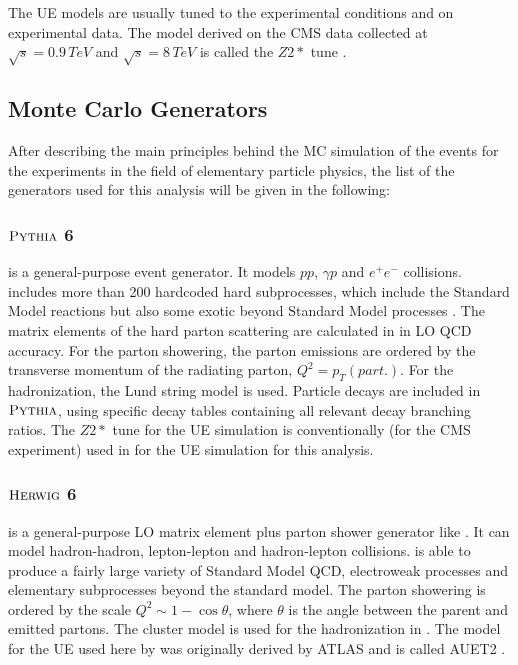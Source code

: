 
The UE models are usually tuned to the experimental conditions and on experimental data. The model derived on the CMS data collected at $\sqrt{s} = 0.9\, TeV$
and $\sqrt{s} = 8\,TeV$ is called the $Z2*$ tune \cite{Chatrchyan:2011id}.


\subsection{Monte Carlo Generators}

After describing the main principles behind the MC simulation of the events for the experiments in the field of elementary particle
physics, the list of the generators used for this analysis will be given in the following:

\subsubsection{$\textsc{Pythia}$ 6}

\PYTHIA \cite{Sjostrand:2006za} is a general-purpose event generator. It models $pp$, $\gamma p$ and $e^{+}e^{-}$ collisions. \PYTHIA includes more than 200 hardcoded
hard subprocesses, which include the Standard Model reactions but also some exotic beyond Standard Model processes \cite{Buckley:2011ms}.
%
The matrix elements of the hard parton scattering are calculated in \PYTHIA in LO QCD accuracy.
%
For the parton showering, the parton emissions are ordered by the transverse momentum of the radiating parton, $Q^{2} = p_{T}(part.)$.
%
For the hadronization, the Lund string model is used.
%
Particle decays are included in $\textsc{Pythia}$, using specific decay tables containing all relevant decay branching ratios.
%
The $Z2*$ tune for the UE simulation is conventionally (for the CMS experiment) used in \PYTHIA for the UE simulation for this analysis.

\subsubsection{$\textsc{Herwig}$ 6}

\HERWIG \cite{Corcella:2000bw} is a general-purpose LO matrix element plus parton shower generator like \PYTHIA. It can model hadron-hadron, 
lepton-lepton and hadron-lepton collisions.
%
\HERWIG is able to produce a fairly large variety of Standard Model QCD, electroweak processes and elementary subprocesses beyond the standard model.
%
The parton showering is ordered by the scale $Q^{2} \sim 1 - \cos\theta$, where $\theta$ is the angle between the parent and emitted partons.
%
The cluster model is used for the hadronization in \HERWIG.
%
The model for the UE used here by \HERWIG was originally derived by ATLAS and is called AUET2 \cite{ATL-PHYS-PUB-2011-009}.

